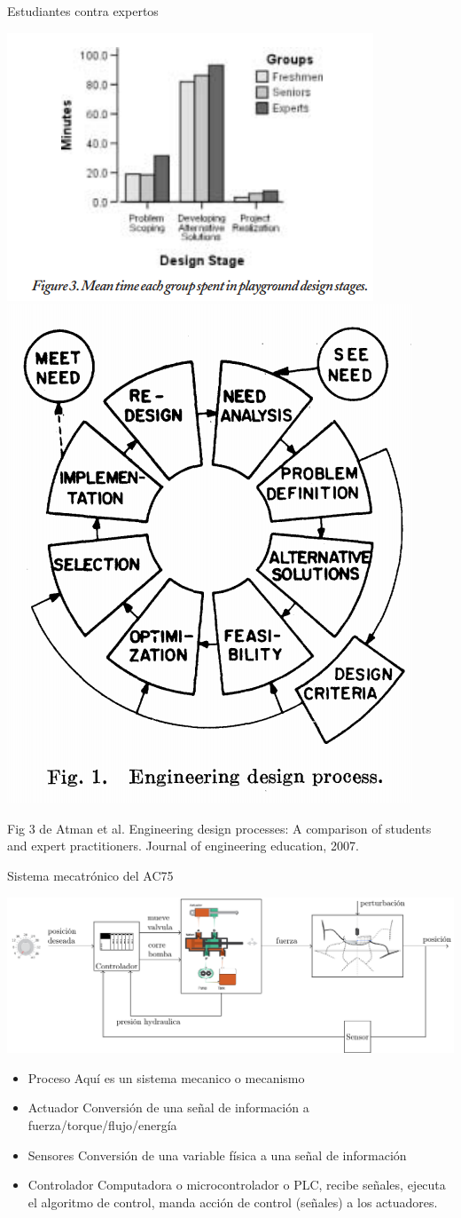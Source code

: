 \documentclass[presentation,aspectratio=169]{beamer}
\begin{document}
\begin{frame}[label={sec:orge425b73}]{Estudiantes contra expertos}
\begin{center}
\includegraphics[width=0.5\linewidth]{../../figures/playground-design-student-experts.png}
\includegraphics[width=0.3\linewidth]{../../figures/design-process-fig1.png}
\end{center}
\footnotesize Fig 3 de Atman et al. Engineering design processes: A comparison of students and expert practitioners. Journal of engineering education, 2007.
\end{frame}


\begin{frame}[label={sec:org89022f8}]{Sistema mecatrónico del AC75}
\begin{center}
\includegraphics[width=.76\textwidth]{../../figures/ac75-control-block-details}
\end{center}

\begin{itemize}
\item \alert{Proceso} Aquí es un \alert{sistema mecanico} o \alert{mecanismo}
\item \alert{Actuador} Conversión de una señal de información a fuerza/torque/flujo/energía
\item \alert{Sensores}  Conversión de una variable física a una señal de información
\item \alert{Controlador} Computadora o microcontrolador o PLC, recibe señales, ejecuta el algoritmo de control, manda acción de control (señales) a los actuadores.
\end{itemize}
\end{frame}
\end{document}
